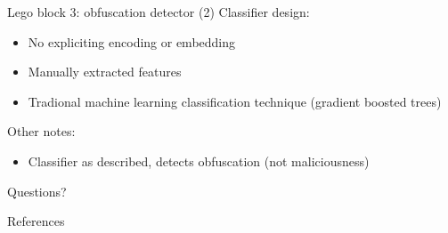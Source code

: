 \documentclass[10pt]{beamer}
\begin{document}
\begin{frame}{Lego block 3: obfuscation detector (2)}
	Classifier design:
	\begin{itemize}
		\item No expliciting encoding or embedding
		\item Manually extracted features
		\item Tradional machine learning classification technique (gradient boosted trees)
	\end{itemize}
	Other notes:
	\begin{itemize}
		\item Classifier as described, detects obfuscation (not maliciousness)
	\end{itemize}
\end{frame}

\begin{frame}[standout]
  Questions?
\end{frame}

\appendix

\begin{frame}[allowframebreaks]{References}

  
  

\end{frame}
\end{document}
